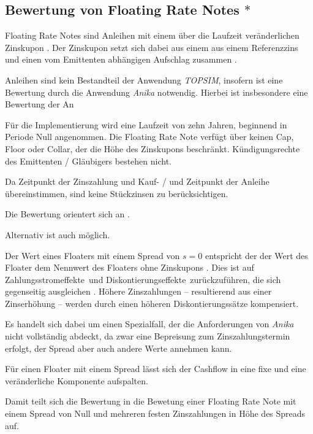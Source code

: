 \documentclass[12pt, a4paper]{article}
\begin{document}
\subsection{Bewertung von Floating Rate Notes $\ast$}
\label{sec:bewertung_von_floating_rate_notes}
Floating Rate Notes sind Anleihen mit einem über die Laufzeit veränderlichen Zinskupon \autocite[][373]{fabozzi_handbook_2005}. Der Zinskupon setzt sich dabei aus einem aus einem Referenzzins und einen vom Emittenten abhängigen Aufschlag zusammen \autocite[][374]{fabozzi_handbook_2005}.

Anleihen sind kein Bestandteil der Anwendung \textit{TOPSIM}, insofern ist eine Bewertung durch die Anwendung \textit{Anika} notwendig.
Hierbei ist insbesondere eine Bewertung der An

Für die Implementierung wird eine Laufzeit von zehn Jahren, beginnend in Periode Null angenommen.
Die Floating Rate Note verfügt über keinen Cap, Floor oder Collar, der die Höhe des Zinskupons beschränkt.
Kündigungsrechte des Emittenten / Gläubigers bestehen nicht.

Da Zeitpunkt der Zinszahlung und Kauf- / und Zeitpunkt der Anleihe übereinstimmen, sind keine Stückzinsen zu berücksichtigen.

Die Bewertung orientert sich an \autocite[][]{veronesi_fixed_2010}.

Alternativ ist auch \autocite[][]{fabozzi_handbook_2005} möglich.

Der Wert eines Floaters mit einem Spread von $s=0$ entspricht der der Wert des Floater dem Nennwert des Floaters ohne Zinskupons \autocite[][S.~52~f.]{veronesi_fixed_2010}. Dies ist auf \glqq Zahlungsstromeffekte\grqq~und \glqq Diskontierungseffekte\grqq~zurückzuführen, die sich gegenseitig ausgleichen \autocite[][S.~54]{veronesi_fixed_2010}. Höhere Zinszahlungen -- resultierend aus einer Zinserhöhung -- werden durch einen höheren Diskontierungssätze kompensiert.

Es handelt sich dabei um einen Spezialfall, der die Anforderungen von \textit{Anika} nicht vollständig abdeckt, da zwar eine Bepreisung zum Zinszahlungstermin erfolgt, der Spread aber auch andere Werte annehmen kann.

Für einen Floater mit einem Spread lässt sich der Cashflow in eine fixe und eine veränderliche Komponente aufspalten.

Damit teilt sich die Bewertung in die Bewetung einer Floating Rate Note mit einem Spread von Null und mehreren festen Zinszahlungen in Höhe des Spreads auf.
\end{document}
